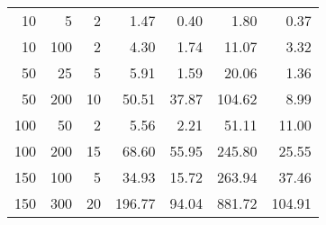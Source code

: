 \begin{tabular}{rrrrrrr}
\toprule
  10 &    5 &   2 &   1.47 &  0.40 &   1.80 &   0.37 \\
  10 &  100 &   2 &   4.30 &  1.74 &  11.07 &   3.32 \\
  50 &   25 &   5 &   5.91 &  1.59 &  20.06 &   1.36 \\
  50 &  200 &  10 &  50.51 & 37.87 & 104.62 &   8.99 \\
 100 &   50 &   2 &   5.56 &  2.21 &  51.11 &  11.00 \\
 100 &  200 &  15 &  68.60 & 55.95 & 245.80 &  25.55 \\
 150 &  100 &   5 &  34.93 & 15.72 & 263.94 &  37.46 \\
 150 &  300 &  20 & 196.77 & 94.04 & 881.72 & 104.91 \\
\bottomrule
\end{tabular}
